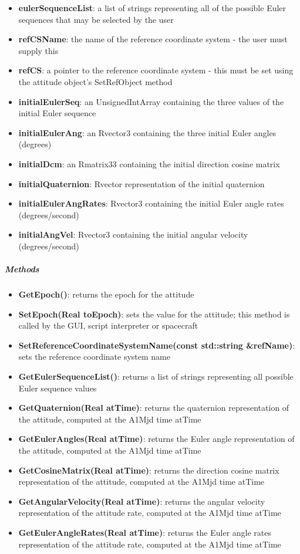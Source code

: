 \begin{itemize}
\item \textbf{eulerSequenceList}:  a list of strings representing all of the possible Euler sequences that may be selected by the user
\item \textbf{refCSName}: the name of the reference coordinate system - the user must supply this
\item \textbf{refCS}: a pointer to the reference coordinate system - this must be set using the attitude object's SetRefObject method
\item \textbf{initialEulerSeq}: an UnsignedIntArray containing the three values of the initial Euler sequence
\item \textbf{initialEulerAng}: an Rvector3 containing the three initial Euler angles (degrees)
\item \textbf{initialDcm}: an Rmatrix33 containing the initial direction cosine matrix
\item \textbf{initialQuaternion}: Rvector representation of the initial quaternion
\item \textbf{initialEulerAngRates}: Rvector3 containing the initial Euler angle rates (degrees/second)
\item \textbf{initialAngVel}: Rvector3 containing the initial angular velocity (degrees/second)
\end{itemize}

\subparagraph{\textit{Methods}}

\begin{itemize}
\item \textbf{GetEpoch()}: returns the epoch for the attitude
\item \textbf{SetEpoch(Real toEpoch)}: sets the value for the attitude; this method is called by the GUI, script interpreter or spacecraft
\item \textbf{SetReferenceCoordinateSystemName(const std::string \&refName)}: sets the reference coordinate system name
\item \textbf{GetEulerSequenceList()}: returns a list of strings representing all possible Euler sequence values
\item \textbf{GetQuaternion(Real atTime)}: returns the quaternion representation of the attitude, computed at the A1Mjd time atTime
\item \textbf{GetEulerAngles(Real atTime)}: returns the Euler angle representation of the attitude, computed at the A1Mjd time atTime
\item \textbf{GetCosineMatrix(Real atTime)}: returns the direction cosine matrix representation of the attitude, computed at the A1Mjd time atTime
\item \textbf{GetAngularVelocity(Real atTime)}: returns the angular velocity representation of the attitude rate, computed at the A1Mjd time atTime
\item \textbf{GetEulerAngleRates(Real atTime)}: returns the Euler angle rates representation of the attitude rate, computed at the A1Mjd time atTime
\end{itemize}


